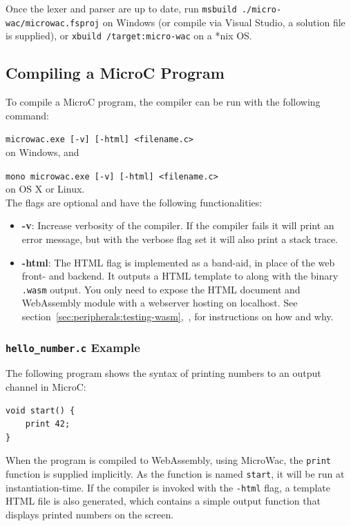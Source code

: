 \documentclass[a4paper]{article}
\begin{document}
Once the lexer and parser are up to date, run \texttt{msbuild ./micro-wac/microwac.fsproj} on Windows (or compile via Visual Studio, a solution file is supplied), or \texttt{xbuild /target:micro-wac} on a *nix OS.

\subsection{Compiling a MicroC Program}
\label{sec:user-guide:compile-microc}
To compile a MicroC program, the compiler can be run with the following command:

\texttt{microwac.exe [-v] [-html] <filename.c>}\\
on Windows, and

\texttt{mono microwac.exe [-v] [-html] <filename.c>}\\
on OS X or Linux.\\

\noindent The flags are optional and have the following functionalities:
\begin{itemize}
	\item \textbf{-v}: Increase verbosity of the compiler. If the compiler fails it will print an error message, but with the verbose flag set it will also print a stack trace.
	\item \textbf{-html}: The HTML flag is implemented as a band-aid, in place of the web front- and backend. It outputs a HTML template to along with the binary \texttt{.wasm} output. You only need to expose the HTML document and WebAssembly module with a webserver hosting on localhost. See section~\ref{sec:peripherals:testing-wasm},~, for instructions on how and why.
\end{itemize}

\subsubsection{\texttt{hello\_number.c} Example}
The following program shows the syntax of printing numbers to an output channel in MicroC:
\begin{verbatim}
void start() {
	print 42;
}
\end{verbatim}

When the program is compiled to WebAssembly, using MicroWac, the \texttt{print} function is supplied implicitly. As the function is named \texttt{start}, it will be run at instantiation-time. If the compiler is invoked with the \texttt{-html} flag, a template HTML file is also generated, which contains a simple output function that displays printed numbers on the screen.
\end{document}
